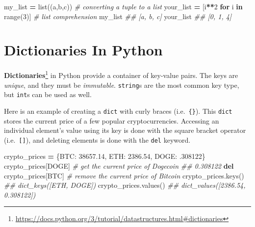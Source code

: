 \documentclass[
  12pt,
  krantz2]{krantz}
\makeatletter
\newenvironment{Shaded}{\begin{snugshade}}{\end{snugshade}}
\newcommand{\BuiltInTok}[1]{#1}
\newcommand{\CommentTok}[1]{\textcolor[rgb]{0.37,0.37,0.37}{\textit{#1}}}
\newcommand{\ControlFlowTok}[1]{\textcolor[rgb]{0.27,0.27,0.27}{\textbf{#1}}}
\newcommand{\DecValTok}[1]{\textcolor[rgb]{0.06,0.06,0.06}{#1}}
\newcommand{\FloatTok}[1]{\textcolor[rgb]{0.06,0.06,0.06}{#1}}
\newcommand{\KeywordTok}[1]{\textcolor[rgb]{0.27,0.27,0.27}{\textbf{#1}}}
\newcommand{\NormalTok}[1]{#1}
\newcommand{\OperatorTok}[1]{\textcolor[rgb]{0.43,0.43,0.43}{\textbf{#1}}}
\newcommand{\StringTok}[1]{\textcolor[rgb]{0.5,0.5,0.5}{#1}}
\renewcommand{\href}[2]{#2\footnote{\url{#1}}}
\newenvironment{kframe}{%
\medskip{}
\setlength{\fboxsep}{.8em}
 \def\at@end@of@kframe{}%
 \ifinner\ifhmode%
  \def\at@end@of@kframe{\end{minipage}}%
  \begin{minipage}{\columnwidth}%
 \fi\fi%
 \def\FrameCommand##1{\hskip\@totalleftmargin \hskip-\fboxsep
 \colorbox{shadecolor}{##1}\hskip-\fboxsep
     \hskip-\linewidth \hskip-\@totalleftmargin \hskip\columnwidth}%
 \MakeFramed {\advance\hsize-\width
   \@totalleftmargin\z@ \linewidth\hsize
   \@setminipage}}%
 {\par\unskip\endMakeFramed%
 \at@end@of@kframe}
\renewenvironment{Shaded}{\begin{kframe}}{\end{kframe}}
\makeatother
\begin{document}
\begin{Shaded}
\begin{Highlighting}[]
\NormalTok{my\_list }\OperatorTok{=} \BuiltInTok{list}\NormalTok{((}\StringTok{\textquotesingle{}a\textquotesingle{}}\NormalTok{,}\StringTok{\textquotesingle{}b\textquotesingle{}}\NormalTok{,}\StringTok{\textquotesingle{}c\textquotesingle{}}\NormalTok{)) }\CommentTok{\# converting a tuple to a list}
\NormalTok{your\_list }\OperatorTok{=}\NormalTok{ [i}\OperatorTok{**}\DecValTok{2} \ControlFlowTok{for}\NormalTok{ i }\KeywordTok{in} \BuiltInTok{range}\NormalTok{(}\DecValTok{3}\NormalTok{)] }\CommentTok{\# list comprehension}
\NormalTok{my\_list}
\CommentTok{\#\# [\textquotesingle{}a\textquotesingle{}, \textquotesingle{}b\textquotesingle{}, \textquotesingle{}c\textquotesingle{}]}
\NormalTok{your\_list}
\CommentTok{\#\# [0, 1, 4]}
\end{Highlighting}
\end{Shaded}

\hypertarget{dictionaries-in-python}{%
\section{Dictionaries In Python}\label{dictionaries-in-python}}

\href{https://docs.python.org/3/tutorial/datastructures.html\#dictionaries}{\textbf{Dictionaries}} in Python provide a container of key-value pairs. The keys are \emph{unique}, and they must be \emph{immutable}. \texttt{string}s are the most common key type, but \texttt{int}s can be used as well.

Here is an example of creating a \texttt{dict} with curly braces (i.e.~\texttt{\{\}}). This \texttt{dict} stores the current price of a few popular cryptocurrencies. Accessing an individual element's value using its key is done with the square bracket operator (i.e.~\texttt{{[}{]}}), and deleting elements is done with the \texttt{del} keyword.

\begin{Shaded}
\begin{Highlighting}[]
\NormalTok{crypto\_prices }\OperatorTok{=}\NormalTok{ \{}\StringTok{\textquotesingle{}BTC\textquotesingle{}}\NormalTok{: }\FloatTok{38657.14}\NormalTok{, }\StringTok{\textquotesingle{}ETH\textquotesingle{}}\NormalTok{: }\FloatTok{2386.54}\NormalTok{, }\StringTok{\textquotesingle{}DOGE\textquotesingle{}}\NormalTok{: }\FloatTok{.308122}\NormalTok{\}}
\NormalTok{crypto\_prices[}\StringTok{\textquotesingle{}DOGE\textquotesingle{}}\NormalTok{] }\CommentTok{\# get the current price of Dogecoin}
\CommentTok{\#\# 0.308122}
\KeywordTok{del}\NormalTok{ crypto\_prices[}\StringTok{\textquotesingle{}BTC\textquotesingle{}}\NormalTok{] }\CommentTok{\# remove the current price of Bitcoin}
\NormalTok{crypto\_prices.keys()}
\CommentTok{\#\# dict\_keys([\textquotesingle{}ETH\textquotesingle{}, \textquotesingle{}DOGE\textquotesingle{}])}
\NormalTok{crypto\_prices.values()}
\CommentTok{\#\# dict\_values([2386.54, 0.308122])}
\end{Highlighting}
\end{Shaded}
\end{document}
